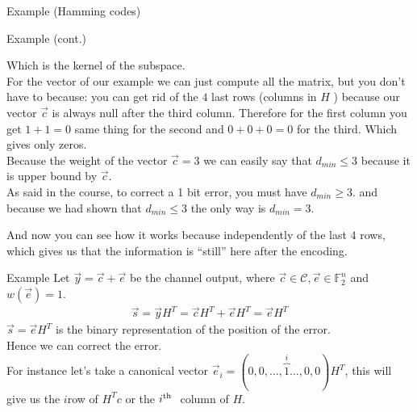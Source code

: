 \begin{parag}{Example (Hamming codes)}
\begin{subparag}{Example (cont.)}
\begin{framedremark}
                Which is the kernel of the subspace.\\
                For the vector of our example we can just compute all the matrix, but you don't have to because: you can get rid of the $4$ last rows (columns in $H$ ) because our vector $\vec{c}$ is always null after the third column. Therefore for the first column you get $1 + 1 = 0$ same thing for the second and $0 + 0 + 0 = 0$ for the third. Which gives only zeros.\\
                Because the weight of the vector $\vec{c} =  3$ we can easily say that $d_{min} \leq 3$ because it is upper bound by $\vec{c}$.\\
                As said in the course, to correct a 1 bit error, you must have $d_{min} \geq 3$. and because we had shown that $d_{min} \leq 3$ the only way is $d_{min} =  3$.
            \end{framedremark}
            \begin{framedremark}
            And now you can see how it works because independently of the last $4$ rows, which gives us that the information is ``still'' here after the encoding.
            \end{framedremark}
        \end{subparag}
        \begin{subparag}{Example}
            Let $\vec{y} =  \vec{c} + \vec{e}$ be the channel output, where $\vec{c} \in \mathcal{C}, \vec{e} \in \mathbb{F}_2^n$ and $w\left(\vec{e}\right) =  1$.\\
           \begin{align*} \vec{s} =  \vec{y}H^T = \vec{c}H^T + \vec{e}H^T =  \vec{e}H^T \end{align*}
           $\vec{s} =  \vec{e}H^T$ is the binary representation of the position of the error.\\
           Hence we can correct the error.\\
           For instance let's take a canonical vector $\vec{e}_i =  \left(0, 0, \ldots, \overbrace{1}^{i}\ldots, 0, 0\right)H^T$, this will give us the $i$\Th row of $H^Tc$ or the $i\textsuperscript{th}\ $ column of $H$. 
        \end{subparag}
        
    \end{parag}
    

